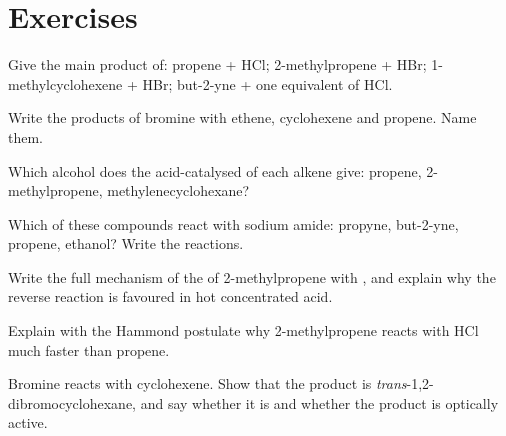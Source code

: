 \section{Exercises}

\begin{exercise}[$\star$]\label{exo:b1:electrophilic-additions:1}
Give the main product of: propene + HCl; 2-methylpropene + HBr;
1-methylcyclohexene + HBr; but-2-yne + one equivalent of HCl.
\end{exercise}

\begin{exercise}[$\star$]\label{exo:b1:electrophilic-additions:2}
Write the products of bromine with ethene, cyclohexene and propene. Name
them.
\end{exercise}

\begin{exercise}[$\star$]\label{exo:b1:electrophilic-additions:3}
Which alcohol does the acid-catalysed  of each alkene give:
propene, 2-methylpropene, methylenecyclohexane?
\end{exercise}

\begin{exercise}[$\star$]\label{exo:b1:electrophilic-additions:4}
Which of these compounds react with sodium amide: propyne, but-2-yne,
propene, ethanol? Write the reactions.
\end{exercise}

\begin{exercise}[$\star\star$]\label{exo:b1:electrophilic-additions:5}
Write the full mechanism of the  of 2-methylpropene with , and explain why the reverse reaction is favoured in hot
concentrated acid.
\end{exercise}

\begin{exercise}[$\star\star$]\label{exo:b1:electrophilic-additions:6}
Explain with the Hammond postulate why 2-methylpropene reacts with HCl
much faster than propene.
\end{exercise}

\begin{exercise}[$\star\star$]\label{exo:b1:electrophilic-additions:7}
Bromine reacts with cyclohexene. Show that the product is
\textit{trans}-1,2-dibromocyclohexane, and say whether it is  and
whether the product is optically active.
\end{exercise}

